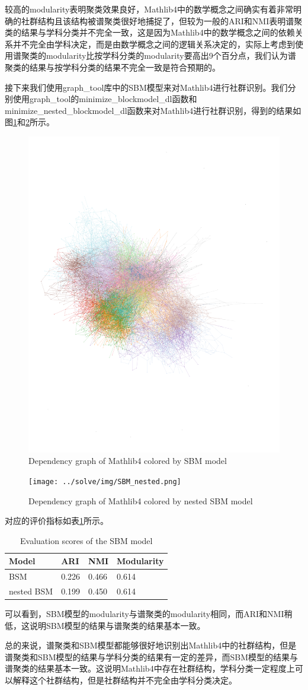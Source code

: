 较高的modularity表明聚类效果良好，Mathlib4中的数学概念之间确实有着非常明确的社群结构且该结构被谱聚类很好地捕捉了，但较为一般的ARI和NMI表明谱聚类的结果与学科分类并不完全一致，这是因为Mathlib4中的数学概念之间的依赖关系并不完全由学科决定，而是由数学概念之间的逻辑关系决定的，实际上考虑到使用谱聚类的modularity比按学科分类的modularity要高出9个百分点，我们认为谱聚类的结果与按学科分类的结果不完全一致是符合预期的。

接下来我们使用graph\_tool库中的SBM模型来对Mathlib4进行社群识别。我们分别使用graph\_tool的minimize\_blockmodel\_dl函数和minimize\_nested\_blockmodel\_dl函数来对Mathlib4进行社群识别，得到的结果如图\ref{fig:SBM}和\ref{fig:nest_SBM}所示。

\begin{figure}[h!]
    \centering
    \includegraphics[width=.6\textwidth]{../solve/img/SBM.png}
    \caption{Dependency graph of Mathlib4 colored by SBM model}
    \label{fig:SBM}
\end{figure}

\begin{figure}[h!]
  \centering
  \texttt{[image: ../solve/img/SBM\_nested.png]}
  \caption{Dependency graph of Mathlib4 colored by nested SBM model}
  \label{fig:nest_SBM}
\end{figure}

对应的评价指标如表\ref{tab:score2}所示。
\begin{table}[h!]
  \centering
  \begin{tabular}{llll}
    \toprule
    Model & ARI & NMI & Modularity\\
    \midrule
    BSM & 0.226 & 0.466 & 0.614\\
    nested BSM & 0.199 & 0.450 & 0.614\\
    \bottomrule
  \end{tabular}
  \caption{Evaluation scores of the SBM model}
  \label{tab:score2}
\end{table}

可以看到，SBM模型的modularity与谱聚类的modularity相同，而ARI和NMI稍低，这说明SBM模型的结果与谱聚类的结果基本一致。

总的来说，谱聚类和SBM模型都能够很好地识别出Mathlib4中的社群结构，但是谱聚类和SBM模型的结果与学科分类的结果有一定的差异，而SBM模型的结果与谱聚类的结果基本一致。这说明Mathlib4中存在社群结构，学科分类一定程度上可以解释这个社群结构，但是社群结构并不完全由学科分类决定。





